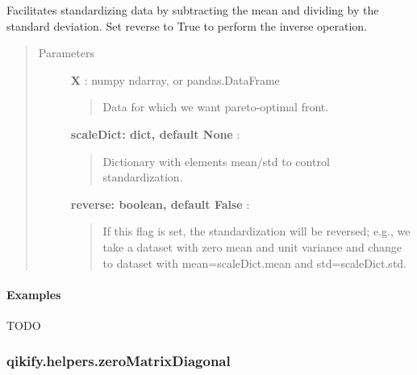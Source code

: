\documentclass[letterpaper,10pt,english]{sphinxmanual}
\begin{document}
\begin{fulllineitems}
\label{generated/qikify.helpers.standardize:qikify.helpers.standardize}
Facilitates standardizing data by subtracting the mean and dividing by
the standard deviation. Set reverse to True to perform the inverse 
operation.
\begin{quote}\begin{description}
\item[{Parameters }] \leavevmode
\textbf{X} : numpy ndarray, or pandas.DataFrame
\begin{quote}

Data for which we want pareto-optimal front.
\end{quote}

\textbf{scaleDict: dict, default None} :
\begin{quote}

Dictionary with elements mean/std to control standardization.
\end{quote}

\textbf{reverse: boolean, default False} :
\begin{quote}

If this flag is set, the standardization will be reversed; e.g.,
we take a dataset with zero mean and unit variance and change to
dataset with mean=scaleDict.mean and std=scaleDict.std.
\end{quote}

\end{description}\end{quote}
\paragraph{Examples}

TODO

\end{fulllineitems}



\subsubsection{qikify.helpers.zeroMatrixDiagonal}
\label{generated/qikify.helpers.zeroMatrixDiagonal:qikify-helpers-zeromatrixdiagonal}\label{generated/qikify.helpers.zeroMatrixDiagonal::doc}
\end{document}

